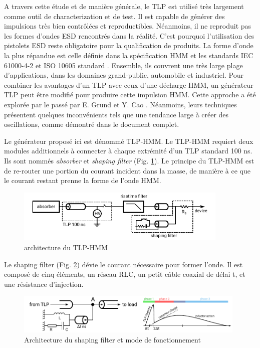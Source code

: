 A travers cette étude et de manière générale, le TLP est utilisé très largement comme outil de characterization et de test.
Il est capable de générer des impulsions très bien contrôlées et reproductibles.
Néanmoins, il ne reproduit pas les formes d'ondes ESD rencontrés dans la réalité.
C'est pourquoi l'utilisation des pistolets ESD reste obligatoire pour la qualification de produits.
La forme d'onde la plus répandue est celle définie dans la spécification HMM \cite{hmm} et les standards IEC 61000-4-2 \cite{iec61000-4-2} et ISO 10605 standard \cite{iso10605}.
Ensemble, ils couvrent une très large plage d'applications, dans les domaines grand-public, automobile et industriel.
Pour combiner les avantages d'un TLP avec ceux d'une décharge HMM, un générateur TLP peut être modifié pour produire cette impulsion HMM.
Cette approche a été explorée par le passé par E. Grund \cite{iec61000-tlp} et Y. Cao \cite{tlp-based-hmm}.
Néanmoins, leurs techniques présentent quelques inconvénients tels que une tendance large à créer des oscillations, comme démontré dans le document complet.

Le générateur proposé ici est dénommé TLP-HMM.
Le TLP-HMM requiert deux modules additionnels à connecter à chaque extrémité d'un TLP standard 100 ns.
Ils sont nommés \textit{absorber} et \textit{shaping filter} (Fig. \ref{fig:tlp_hmm_architecture}).
Le principe du TLP-HMM est de re-router une portion du courant incident dans la masse, de manière à ce que le courant restant prenne la forme de l'onde HMM.

\begin{figure}[!h]
  \centering
  \includegraphics[width=0.9\textwidth]{src/1/figures/beges_tlp_hmm.pdf}
  \caption{architecture du TLP-HMM}
  \label{fig:tlp_hmm_architecture}
\end{figure}

Le shaping filter (Fig. \ref{fig:shaping_filter_example}) dévie le courant nécessaire pour former l'onde.
Il est composé de cinq éléments, un réseau RLC, un petit câble coaxial de délai \textDelta{}t, et une résistance d'injection.

\begin{figure}[!h]
  \centering
  \includegraphics[width=0.98\textwidth]{src/1/figures/example_tlp_hmm.pdf}
  \caption{Architecture du shaping filter et mode de fonctionnement}
  \label{fig:shaping_filter_example}
\end{figure}

